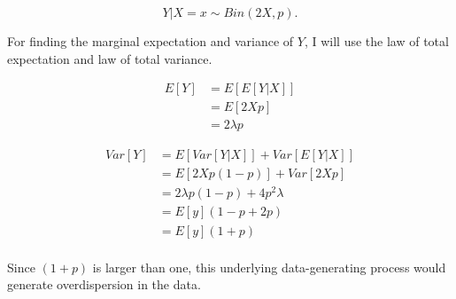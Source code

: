 \begin{equation}
    Y|X=x \sim Bin(2X,p).
\end{equation}

\noindent For finding the marginal expectation and variance of $Y$, I will use the law of total expectation and law of total variance.

\begin{equation}
\begin{aligned}
    E[Y] &= E[E[Y|X]] \\
        &= E[2Xp] \\
        &= 2\lambda p
\end{aligned}
\end{equation}

\begin{equation}
\begin{aligned}
    Var[Y] &= E[Var[Y|X]] + Var[E[Y|X]] \\
        &= E[2Xp(1-p)] + Var[2Xp] \\
        &= 2\lambda p(1-p) + 4p^2\lambda \\
        &= E[y](1-p + 2p) \\
        &= E[y](1 + p) \\
\end{aligned}
\end{equation}

\noindent Since $(1 + p)$ is larger than one, this underlying data-generating process would generate overdispersion in the data.
